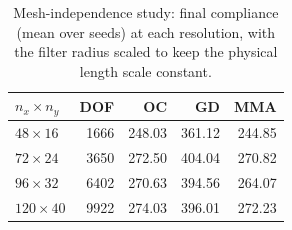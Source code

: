 \begin{table}[htbp]
\centering
\caption{Mesh-independence study: final compliance (mean over seeds) at each resolution, with the filter radius scaled to keep the physical length scale constant.}
\label{tab:mesh}
\begin{tabular}{lrrrr}
\toprule
$n_x \times n_y$ & DOF & OC & GD & MMA \\
\midrule
$48\times16$ & 1666 & 248.03 & 361.12 & 244.85 \\
$72\times24$ & 3650 & 272.50 & 404.04 & 270.82 \\
$96\times32$ & 6402 & 270.63 & 394.56 & 264.07 \\
$120\times40$ & 9922 & 274.03 & 396.01 & 272.23 \\
\bottomrule
\end{tabular}
\end{table}
